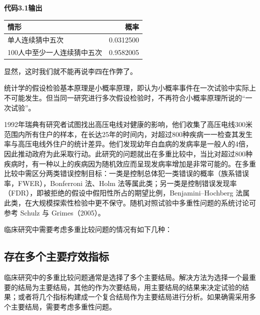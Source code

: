 \documentclass[
  chinese-hans,
  letterpaper,
  DIV=11,
  numbers=noendperiod]{scrreprt}
\newcounter{none} %
\begin{document}
\begin{tcolorbox}[enhanced jigsaw, arc=.35mm, bottomrule=.15mm, breakable, colback=white, colframe=quarto-callout-note-color-frame, left=2mm, leftrule=.75mm, opacityback=0, rightrule=.15mm, toprule=.15mm]

\vspace{-3mm}\textbf{代码3.1输出}\vspace{3mm}

{\def\LTcaptype{none} %
\begin{longtable}[]{@{}lr@{}}
\toprule\noalign{}
情形 & 概率 \\
\midrule\noalign{}
\endhead
\bottomrule\noalign{}
\endlastfoot
单人连续猜中五次 & 0.0312500 \\
100人中至少一人连续猜中五次 & 0.9582005 \\
\end{longtable}
}

\end{tcolorbox}

显然，这时我们就不能再说李四在作弊了。

统计学的假设检验基本原理是小概率原理，即认为小概率事件在一次试验中实际上不可能发生。但当同一研究进行多次假设检验时，不再符合小概率原理所说的``一次试验''。

1992年瑞典有研究者试图找出高压电线对健康的影响，他们收集了高压电线300米范围内所有住户的样本，在长达25年的时间内，对超过800种疾病一一检查其发生率与高压电线外住户的统计差异。他们发现幼年白血病的发病率是一般人的4倍，因此推动政府为此采取行动。此研究的问题就出在多重比较中，当比对超过800种疾病时，有一种以上的疾病因为随机效应而呈现发病率增加是非常可能的。在多重比较中需区分两类错误控制目标：一类是控制总体犯一类错误的概率（族系错误率，FWER），Bonferroni
法、Holm
法等属此类；另一类是控制错误发现率（FDR），即被拒绝的假设中假阳性所占的期望比例，Benjamini--Hochberg
法属此类，在大规模探索性检验中更不保守。随机对照试验中多重性问题的系统讨论可参考
Schulz 与 Grimes（2005）。

临床研究中需要考虑多重比较问题的情况有如下几种：

\subsection{存在多个主要疗效指标}\label{ux5b58ux5728ux591aux4e2aux4e3bux8981ux7597ux6548ux6307ux6807}

临床研究中的多重比较问题通常是选择了多个主要结局。解决方法为选择一个最重要的结局为主要结局，其他的作为次要结局，用主要结局的结果来决定试验的结果；或者将几个指标构建成一个复合结局作为主要结局进行分析。如果确需采用多个主要结局，需要考虑多重性问题。
\end{document}
